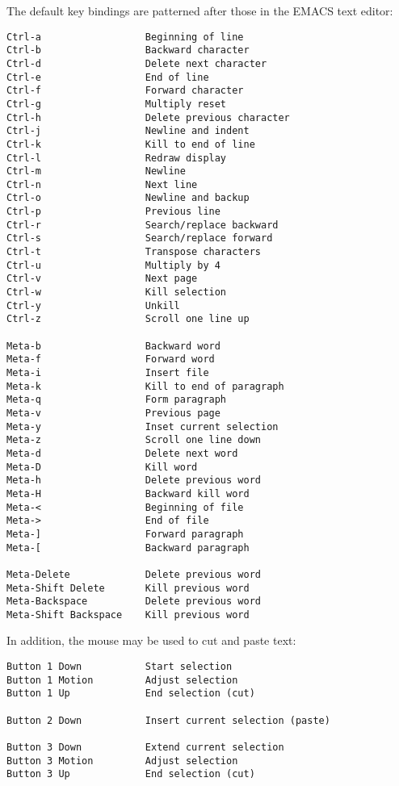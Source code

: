 \begin{sloppypar}
   The default key bindings are patterned after those in the EMACS
text editor:

\begin{verbatim}
Ctrl-a                  Beginning of line
Ctrl-b                  Backward character
Ctrl-d                  Delete next character
Ctrl-e                  End of line
Ctrl-f                  Forward character
Ctrl-g                  Multiply reset
Ctrl-h                  Delete previous character
Ctrl-j                  Newline and indent
Ctrl-k                  Kill to end of line
Ctrl-l                  Redraw display
Ctrl-m                  Newline
Ctrl-n                  Next line
Ctrl-o                  Newline and backup
Ctrl-p                  Previous line
Ctrl-r                  Search/replace backward
Ctrl-s                  Search/replace forward
Ctrl-t                  Transpose characters
Ctrl-u                  Multiply by 4
Ctrl-v                  Next page
Ctrl-w                  Kill selection
Ctrl-y                  Unkill
Ctrl-z                  Scroll one line up

Meta-b                  Backward word
Meta-f                  Forward word
Meta-i                  Insert file
Meta-k                  Kill to end of paragraph
Meta-q                  Form paragraph
Meta-v                  Previous page
Meta-y                  Inset current selection
Meta-z                  Scroll one line down
Meta-d                  Delete next word
Meta-D                  Kill word
Meta-h                  Delete previous word
Meta-H                  Backward kill word
Meta-<                  Beginning of file
Meta->                  End of file
Meta-]                  Forward paragraph
Meta-[                  Backward paragraph

Meta-Delete             Delete previous word
Meta-Shift Delete       Kill previous word
Meta-Backspace          Delete previous word
Meta-Shift Backspace    Kill previous word
\end{verbatim}

   In addition, the mouse may be used to cut and paste text:

\begin{verbatim}
Button 1 Down           Start selection
Button 1 Motion         Adjust selection
Button 1 Up             End selection (cut)

Button 2 Down           Insert current selection (paste)

Button 3 Down           Extend current selection
Button 3 Motion         Adjust selection
Button 3 Up             End selection (cut)
\end{verbatim}



\end{sloppypar}
